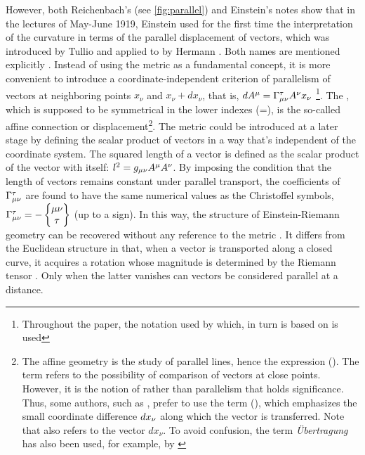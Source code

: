 \documentclass[final]{article}
\newcommand{\xdx}{\ensuremath{x_\nu} and \ensuremath{x_\nu + dx_\nu}\xspace}
\begin{document}
However, both Reichenbach's (see \cref{fig:parallel}) and Einstein's notes show that in the lectures of May-June 1919, Einstein used for the first time the interpretation of the curvature in terms of the parallel displacement of vectors, which was introduced by Tullio \citet{Levi-Civita1916} and applied to \rt by Hermann \citet{Weyl1918}. Both names are mentioned explicitly \citep[028-01-03, 33]{HR}. Instead of using the metric as a fundamental concept, it is more convenient to introduce a coordinate-independent criterion of parallelism of vectors at neighboring points \xdx, that is, $dA^\mu=\Gamma^\tau_{\mu\nu} A^\nu x_\nu$ \citep[028-01-03, 33]{HR}\footnote{Throughout the paper, the notation used by \citet{Reichenbach1928} which, in turn is based on \citet{Eddington1923,Eddington1925} is used}. The \Gtmn, which is supposed to be symmetrical in the lower indexes (\Gtmn=\Gtmn), is the so-called affine connection or displacement\footnote{The affine geometry is the study of parallel lines, \citet{Weyl1918b} hence the expression  (). The term  refers to the possibility of comparison of vectors at close points. However, it is the notion of  rather than parallelism that holds significance. Thus, some authors, such as \citet{Reichenbach1928a}, prefer to use the term  (), which emphasizes the small coordinate difference $dx_{\nu}$ along which the vector is transferred. Note that  also refers to the vector $dx_\nu$. To avoid confusion, the term  \textit{Übertragung} has also been used, for example, by \citet{Schouten1922}}. The metric could be introduced at a later stage by defining the scalar product of vectors in a way that's independent of the coordinate system. The squared length of a vector is defined as the scalar product of the vector with itself: $l^2=g_{\mu\nu} A^\mu A^\nu$. By imposing the condition that the length of vectors remains constant under parallel transport, the coefficients of $\Gamma^\tau_{\mu\nu}$ are found to have the same numerical values as the Christoffel symbols, $\Gamma^\tau_{\mu\nu} = - \begin{Bmatrix} \mu \nu \\ \tau \end{Bmatrix}$ (up to a sign). In this way, the structure of Einstein-Riemann geometry can be recovered without any reference to the metric \gmn. It differs from the Euclidean structure in that, when a vector is transported along a closed curve, it acquires a rotation whose magnitude is determined by the Riemann tensor \riteg. Only when the latter vanishes can vectors be considered parallel at a distance.
\end{document}
